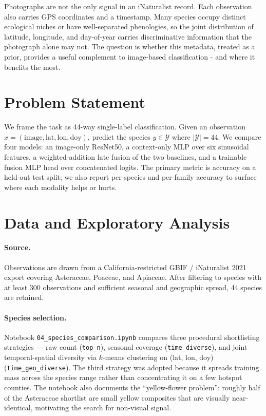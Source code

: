 \documentclass[11pt]{article}
\begin{document}
Photographs are not the only signal in an iNaturalist record. Each observation also carries GPS coordinates and a timestamp. Many species occupy distinct ecological niches or have well-separated phenologies, so the joint distribution of latitude, longitude, and day-of-year carries discriminative information that the photograph alone may not. The question is whether this metadata, treated as a prior, provides a useful complement to image-based classification - and where it benefits the most.

\section{Problem Statement}

We frame the task as 44-way single-label classification. Given an observation $x = (\text{image}, \text{lat}, \text{lon}, \text{doy})$, predict the species $y \in \mathcal{Y}$ where $|\mathcal{Y}| = 44$. We compare four models: an image-only ResNet50, a context-only MLP over six sinusoidal features, a weighted-addition late fusion of the two baselines, and a trainable fusion MLP head over concatenated logits. The primary metric is accuracy on a held-out test split; we also report per-species and per-family accuracy to surface where each modality helps or hurts.

\section{Data and Exploratory Analysis}

\paragraph{Source.} Observations are drawn from a California-restricted GBIF / iNaturalist 2021 export covering Asteraceae, Poaceae, and Apiaceae. After filtering to species with at least 300 observations and sufficient seasonal and geographic spread, 44 species are retained.

\paragraph{Species selection.} Notebook \texttt{04\_species\_comparison.ipynb} compares three procedural shortlisting strategies --- raw count (\texttt{top\_n}), seasonal coverage (\texttt{time\_diverse}), and joint temporal-spatial diversity via $k$-means clustering on (lat, lon, doy) (\texttt{time\_geo\_diverse}). The third strategy was adopted because it spreads training mass across the species range rather than concentrating it on a few hotspot counties. The notebook also documents the ``yellow-flower problem'': roughly half of the Asteraceae shortlist are small yellow composites that are visually near-identical, motivating the search for non-visual signal.
\end{document}
